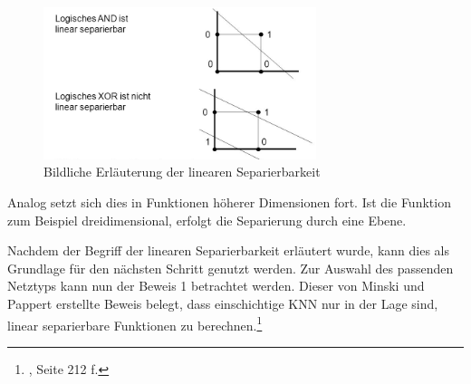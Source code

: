 \begin{figure}[H]
\centering
		\includegraphics[width=0.71\textwidth]{Bilder/Konzeption/Linear_Sep.PNG}
	\caption{Bildliche Erläuterung der linearen Separierbarkeit}
	\label{fig:Bildliche Erläuterung der linearen Separierbarkeit}
\end{figure}

Analog setzt sich dies in Funktionen höherer Dimensionen fort. Ist die Funktion zum Beispiel dreidimensional, erfolgt die Separierung durch eine Ebene.

Nachdem der Begriff der linearen Separierbarkeit erläutert wurde, kann dies als Grundlage für den nächsten Schritt genutzt werden. Zur Auswahl des passenden Netztyps kann nun der Beweis 1 betrachtet werden. Dieser von Minski und Pappert erstellte Beweis  belegt, dass einschichtige KNN nur in der Lage sind, linear separierbare Funktionen zu berechnen.\footnote{\Vgl{}, Seite 212 f.}

\newpage

